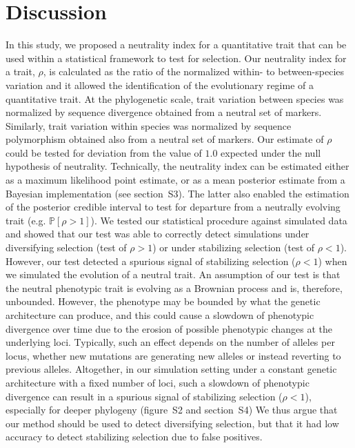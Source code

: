 \documentclass{article}
\newcommand{\proba}{\mathbb{P}}
\newcommand{\NI}{\rho}
\begin{document}
\section*{Discussion}\label{sec:discussion}

In this study, we proposed a neutrality index for a quantitative trait that can be used within a statistical framework to test for selection.
Our neutrality index for a trait, $\NI$, is calculated as the ratio of the normalized within- to between-species variation and it allowed the identification of the evolutionary regime of a quantitative trait.
At the phylogenetic scale, trait variation between species was normalized by sequence divergence obtained from a neutral set of markers.
Similarly, trait variation within species was normalized by sequence polymorphism obtained also from a neutral set of markers.
Our estimate of $\NI$ could be tested for deviation from the value of $1.0$ expected under the null hypothesis of neutrality.
Technically, the neutrality index can be estimated either as a maximum likelihood point estimate, or as a mean posterior estimate from a Bayesian implementation (see section~S3).
The latter also enabled the estimation of the posterior credible interval to test for departure from a neutrally evolving trait (e.g. $ \proba [ \NI > 1 ]$).
We tested our statistical procedure against simulated data and showed that our test was able to correctly detect simulations under diversifying selection (test of $\NI > 1$) or under stabilizing selection (test of $\NI < 1$).
However, our test detected a spurious signal of stabilizing selection ($\NI < 1$) when we simulated the evolution of a neutral trait.
An assumption of our test is that the neutral phenotypic trait is evolving as a Brownian process and is, therefore, unbounded.
However, the phenotype may be bounded by what the genetic architecture can produce, and this could cause a slowdown of phenotypic divergence over time due to the erosion of possible phenotypic changes at the underlying loci.
Typically, such an effect depends on the number of alleles per locus, whether new mutations are generating new alleles or instead reverting to previous alleles.
Altogether, in our simulation setting under a constant genetic architecture with a fixed number of loci, such a slowdown of phenotypic divergence can result in a spurious signal of stabilizing selection ($\NI < 1$), especially for deeper phylogeny (figure~S2 and section~S4)
We thus argue that our method should be used to detect diversifying selection, but that it had low accuracy to detect stabilizing selection due to false positives.
\end{document}
